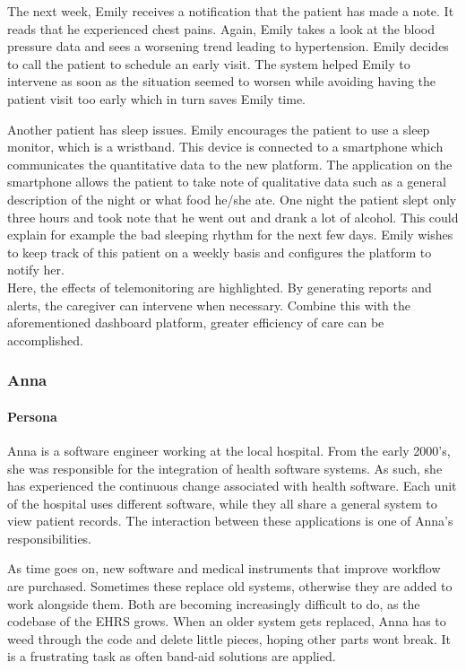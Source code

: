         The next week, Emily receives a notification that the patient has made a note. It reads that he experienced chest pains. Again, Emily takes a look at the blood pressure data and sees a worsening trend leading to hypertension. Emily decides to call the patient to schedule an early visit. The system helped Emily to intervene as soon as the situation seemed to worsen while avoiding having the patient visit too early which in turn saves Emily time.
        
        Another patient has sleep issues. Emily encourages the patient to use a sleep monitor, which is a wristband. This device is connected to a smartphone which communicates the quantitative data to the new platform. The application on the smartphone allows the patient to take note of qualitative data such as a general description of the night or what food he/she ate. One night the patient slept only three hours and took note that he went out and drank a lot of alcohol. This could explain for example the bad sleeping rhythm for the next few days. Emily wishes to keep track of this patient on a weekly basis and configures the platform to notify her.\\

        \noindent Here, the effects of telemonitoring are highlighted. By generating reports and alerts, the caregiver can intervene when necessary. Combine this with the aforementioned dashboard platform, greater efficiency of care can be accomplished.

        \subsubsection{Anna}

        \paragraph{Persona} Anna is a software engineer working at the local hospital. From the early 2000's, she was responsible for the integration of health software systems. As such, she has experienced the continuous change associated with health software. Each unit of the hospital uses different software, while they all share a general system to view patient records. The interaction between these applications is one of Anna's responsibilities.

        As time goes on, new software and medical instruments that improve workflow are purchased. Sometimes these replace old systems, otherwise they are added to work alongside them. Both are becoming increasingly difficult to do, as the codebase of the EHRS grows. When an older system gets replaced, Anna has to weed through the code and delete little pieces, hoping other parts wont break. It is a frustrating task as often band-aid solutions are applied.

